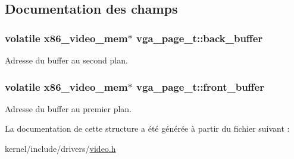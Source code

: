 \subsection{\-Documentation des champs}
\hypertarget{structvga__page__t_aaad0350a467498fb34a0b8b1586ac76c}{
\subsubsection[{back\-\_\-buffer}]{\setlength{\rightskip}{0pt plus 5cm}volatile {\bf x86\-\_\-video\-\_\-mem}$\ast$ {\bf vga\-\_\-page\-\_\-t\-::back\-\_\-buffer}}}\label{structvga__page__t_aaad0350a467498fb34a0b8b1586ac76c}
\-Adresse du buffer au second plan. \hypertarget{structvga__page__t_a8f820f9799bc5f9886e9f74c09e24841}{
\subsubsection[{front\-\_\-buffer}]{\setlength{\rightskip}{0pt plus 5cm}volatile {\bf x86\-\_\-video\-\_\-mem}$\ast$ {\bf vga\-\_\-page\-\_\-t\-::front\-\_\-buffer}}}\label{structvga__page__t_a8f820f9799bc5f9886e9f74c09e24841}
\-Adresse du buffer au premier plan. 

\-La documentation de cette structure a été générée à partir du fichier suivant \-:\begin{DoxyCompactItemize}
\item 
kernel/include/drivers/\hyperlink{video_8h}{video.\-h}\end{DoxyCompactItemize}
